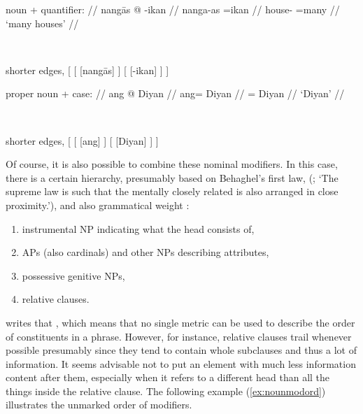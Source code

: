 \a %
	\begin{minipage}[t]{.5\linewidth}
	\begingl
		\glpreamble noun + quantifier: //
		\gla nangās @ -ikan //
		\glb nanga-as =ikan //
		\glc house-\Parg{} =many //
		\glft `many houses' //
	\endgl
	\end{minipage}
	~
	\begin{forest} shorter edges,
	[
		[
			[nangās]
		]
		[
			[-ikan]
		]
	]
	\end{forest}

\a %
	\begin{minipage}[t]{.5\linewidth}
	\begingl
		\glpreamble proper noun + case: //
		\gla ang @ Diyan //
		\glb ang= Diyan //
		\glc \Aarg{}= Diyan //
		\glft `Diyan' //
	\endgl
	\end{minipage}
	~
	\begin{forest} shorter edges,
	[
		[
			[ang]
		]
		[
			[Diyan]
		]
	]
	\end{forest}

\xe

Of course, it is also possible to combine these nominal modifiers. In this
case, there is a certain hierarchy, presumably based on Behaghel's first law,
 (\cite[4]{behaghel1932}; `The supreme law is
such that the mentally closely related is also arranged in close proximity.'), 
and also grammatical weight \citep{wasow1997}:

\begin{enumerate}[noitemsep]
	\item instrumental NP indicating what the head consists of,
	\item APs (also cardinals) and other NPs describing attributes,
	\item possessive genitive NPs,
	\item relative clauses.
\end{enumerate}

\citet{wasow1997} writes that , which means
that no single metric can be used to describe the order of constituents in a
phrase. However, for instance, relative clauses trail whenever possible
presumably since they tend to contain whole subclauses and thus a lot of
information. It seems advisable not to put an element with much less 
information content after them, especially when it refers to a different head
than all the things inside the relative clause. The following example 
(\ref{ex:nounmodord}) illustrates the unmarked order of modifiers.

